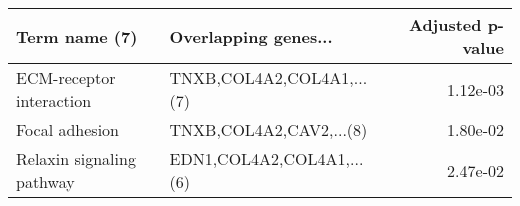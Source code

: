 \begin{tabular}{llr}
\toprule
            Term name (7) &      Overlapping genes... &  Adjusted p-value \\
\midrule
 ECM-receptor interaction & TNXB,COL4A2,COL4A1,...(7) &          1.12e-03 \\
           Focal adhesion &   TNXB,COL4A2,CAV2,...(8) &          1.80e-02 \\
Relaxin signaling pathway & EDN1,COL4A2,COL4A1,...(6) &          2.47e-02 \\
\bottomrule
\end{tabular}
